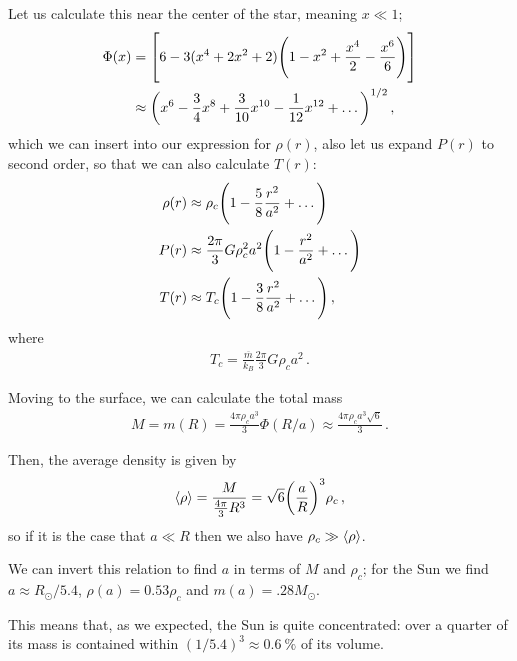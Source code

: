 \documentclass[main.tex]{subfiles}
\begin{document}
Let us calculate this near the center of the star, meaning \(x \ll 1\); 
%
\begin{align}
  \Phi (x) &= \qty[6 - 3 (x^{4} + 2 x^2+ 2) \qty(1 - x^2  +\frac{x^{4}}{2} - \frac{x^{6}}{6})] \\
  &\approx \qty(x^{6} - \frac{3}{4} x^{8} + \frac{3}{10} x^{10} - \frac{1}{12} x^{12}+ \dots)^{1/2}
\,,
\end{align}
%
which we can insert into our expression for \(\rho (r)\), also let us expand \(P(r)\) to second order, so that we can also calculate \(T(r)\):
%
\begin{align}
  \rho (r) &\approx \rho _c \qty(1 - \frac{5}{8} \frac{r^2}{a^2} + \dots) \\
  P(r) &\approx \frac{2 \pi }{3} G \rho _c^2 a^2  \qty(1 - \frac{r^2}{a^2} + \dots) \\
  T(r) &\approx T_c \qty( 1 - \frac{3}{8} \frac{r^2}{a^2} + \dots)
\,,
\end{align}
%
where 
%
\begin{align}
T_c = \frac{\overline{m}}{k_B} \frac{2 \pi }{3} G \rho _c a^2
\,.
\end{align}

Moving to the surface, we can calculate the total mass 
%
\begin{align}
  M = m(R) = \frac{4 \pi \rho_c a^3}{3} \Phi (R/a) \approx
  \frac{4 \pi \rho _c a^3 \sqrt{6}}{3} 
\,.
\end{align}

Then, the average density is given by 
%
\begin{align}
\expval{\rho } = \frac{M}{\frac{4 \pi }{3} R^3} = \sqrt{6}  \qty(\frac{a}{R})^3 \rho _c
\,,
\end{align}
%
so if it is the case that \(a \ll R\) then we also have \(\rho _c \gg \expval{\rho }\). 

We can invert this relation to find \(a\) in terms of \(M\) and \(\rho _c\); for the Sun we find \(a \approx R_{\odot} / 5.4\), \(\rho (a) = 0.53 \rho _c\) and \(m(a) = \num{.28} M_{\odot}\). 

This means that, as we expected, the Sun is quite concentrated: over a quarter of its mass is contained within \((1/5.4)^3 \approx \SI{0.6}{\percent}\) of its volume.

  
  
\end{document}
